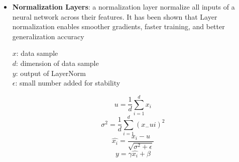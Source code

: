 \begin{itemize}
    \item \textbf{Normalization Layers}: a normalization layer \cite{ba2016layer} normalize all inputs of a neural network across their features. It has been shown that Layer normalization enables smoother gradients, faster training, and better generalization accuracy \cite{xu2019understanding}

    $x$: data sample \\
    $d$: dimension of data sample \\
    $y$: output of LayerNorm \\
    $\epsilon$: small number added for stability

    \begin{equation*}
        u = \frac{1}{d}\sum_{i=1}^{d}x_i 
    \end{equation*}
    \begin{equation*}
        \sigma^2 = \frac{1}{d}\sum_{i=1}^{d}(x_ - ui)^2
    \end{equation*}
    \begin{equation*}
        \hat{x_i} = \frac{x_i - u}{\sqrt{\sigma^2 + \epsilon}}
    \end{equation*}
    \begin{equation*}
        y = \gamma\hat{x_i} + \beta
    \end{equation*}


\end{itemize}
